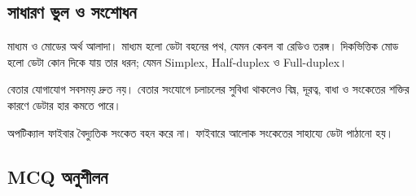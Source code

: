 \subsection{সাধারণ ভুল ও সংশোধন}

মাধ্যম ও মোডের অর্থ আলাদা। মাধ্যম হলো ডেটা বহনের পথ, যেমন কেবল বা রেডিও তরঙ্গ। দিকভিত্তিক মোড হলো ডেটা কোন দিকে যায় তার ধরন; যেমন Simplex, Half-duplex ও Full-duplex।

বেতার যোগাযোগ সবসময় দ্রুত নয়। বেতার সংযোগে চলাচলের সুবিধা থাকলেও বিঘ্ন, দূরত্ব, বাধা ও সংকেতের শক্তির কারণে ডেটার হার কমতে পারে।

অপটিক্যাল ফাইবার বৈদ্যুতিক সংকেত বহন করে না। ফাইবারে আলোক সংকেতের সাহায্যে ডেটা পাঠানো হয়।

\subsection{MCQ অনুশীলন}

